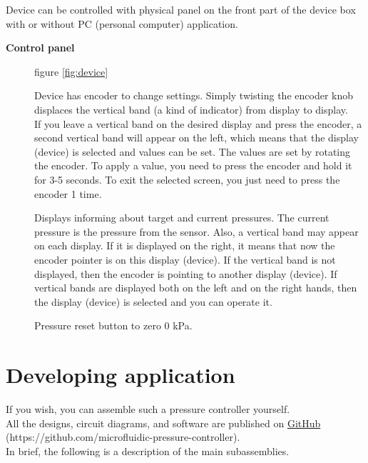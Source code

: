 \documentclass[twoside, 12pt, a4paper]{refart}
\begin{document}
    Device can be controlled with physical panel on the front part of the device box with or without PC (personal computer) application.

  \begin{description}
    \item[\textbf{Control panel}] figure \ref{fig:device} 
    
     Device has encoder to change settings. Simply twisting the encoder knob displaces the vertical band (a kind of indicator) from display to display.\\
If you leave a vertical band on the desired display and press the encoder, a second vertical band will appear on the left, which means that the display (device) is selected and values can be set.
The values are set by rotating the encoder.
To apply a value, you need to press the encoder and hold it for 3-5 seconds.
To exit the selected screen, you just need to press the encoder 1 time.
    
     Displays informing about target and current pressures. The current pressure is the pressure from the sensor. Also, a vertical band may appear on each display. If it is displayed on the right, it means that now the encoder pointer is on this display (device). If the vertical band is not displayed, then the encoder is pointing to another display (device). If vertical bands are displayed both on the left and on the right hands, then the display (device) is selected and you can operate it.
    
     Pressure reset button to zero 0 kPa.
    
  \end{description}

  \newpage
  \section{Developing application}
    If you wish, you can assemble such a pressure controller yourself.\\
    All the designs, circuit diagrams, and software are published on  \href{https://github.com/microfluidic-pressure-controller}{GitHub} (https://github.com/microfluidic-pressure-controller).\\
  
    In brief, the following is a description of the main subassemblies.
    
\end{document}
